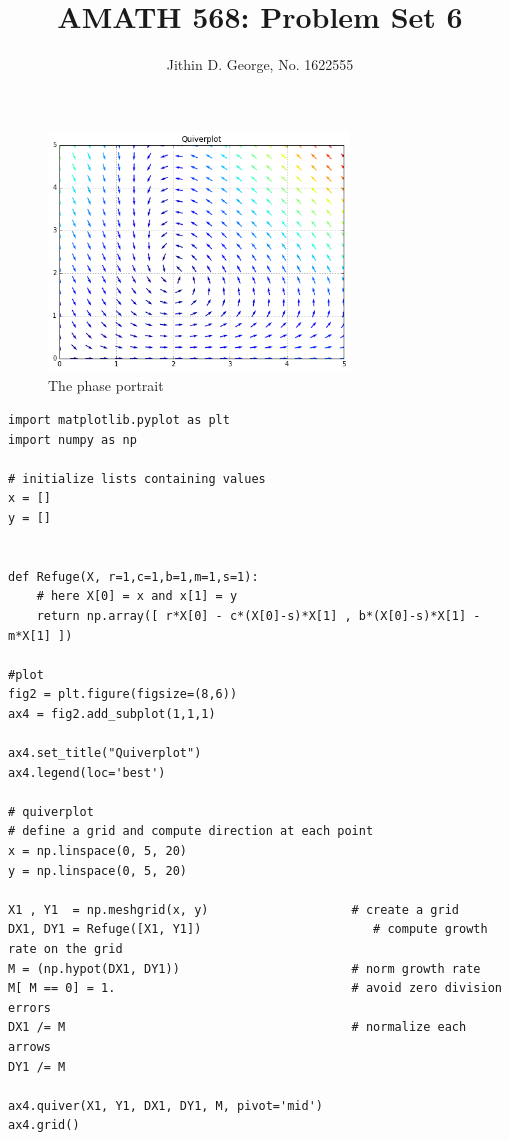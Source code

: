 \documentclass[a4paper]{article}
\title{AMATH 568: Problem Set 6}
\author{Jithin D. George, No. 1622555}
\begin{document}
\begin{figure}[h!] 
	\centering
	\includegraphics[width=8cm]{refuge}
	\caption{The phase portrait}
\end{figure}

\begin{lstlisting}[style=myPythonstyle]
import matplotlib.pyplot as plt
import numpy as np

# initialize lists containing values
x = []
y = []


def Refuge(X, r=1,c=1,b=1,m=1,s=1):
	# here X[0] = x and x[1] = y    
	return np.array([ r*X[0] - c*(X[0]-s)*X[1] , b*(X[0]-s)*X[1] -m*X[1] ])

#plot
fig2 = plt.figure(figsize=(8,6))
ax4 = fig2.add_subplot(1,1,1)

ax4.set_title("Quiverplot")
ax4.legend(loc='best')

# quiverplot
# define a grid and compute direction at each point
x = np.linspace(0, 5, 20)
y = np.linspace(0, 5, 20)

X1 , Y1  = np.meshgrid(x, y)                    # create a grid
DX1, DY1 = Refuge([X1, Y1])                        # compute growth rate on the grid
M = (np.hypot(DX1, DY1))                        # norm growth rate 
M[ M == 0] = 1.                                 # avoid zero division errors 
DX1 /= M                                        # normalize each arrows
DY1 /= M

ax4.quiver(X1, Y1, DX1, DY1, M, pivot='mid')
ax4.grid()
\end{lstlisting}
\end{document}
